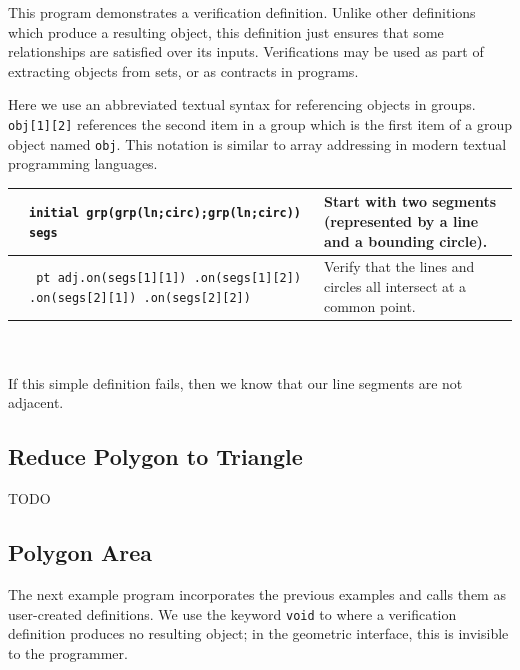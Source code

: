 \documentclass[twoside,11pt]{report}
\begin{document}
This program demonstrates a verification definition. 
Unlike other definitions which produce a resulting object, this definition just ensures that some relationships are satisfied over its inputs. 
Verifications may be used as part of extracting objects from sets, or as contracts in programs.

Here we use an abbreviated textual syntax for referencing objects in groups. 
{\tt obj[1][2]} references the second item in a group which is the first item of a group object named {\tt obj}. 
This notation is similar to array addressing in modern textual programming languages. \\

\noindent \begin{tabularx}{\textwidth}{l X p{4cm}}
\hspace{3.5cm}\vspace{1cm} & {\tt initial grp(grp(ln;circ);\newline grp(ln;circ)) segs } & {\small Start with two segments (represented by a line and a bounding circle). } \\
\hline
\vspace{0.5cm} & 
{\tt
pt adj.on(segs[1][1]) \newline
      .on(segs[1][2]) \newline
      .on(segs[2][1]) \newline
      .on(segs[2][2])
} & {\small Verify that the lines and circles all intersect at a common point.} \\
\end{tabularx}\\\\

If this simple definition fails, then we know that our line segments are not adjacent.

\subsection{Reduce Polygon to Triangle}
\label{subsec:reducepoly}

TODO

\subsection{Polygon Area}
\label{subsec:polyarea}

The next example program incorporates the previous examples and calls them as user-created definitions. 
We use the keyword {\tt void} to where a verification definition produces no resulting object; in the geometric interface, this is invisible to the programmer.
\end{document}
